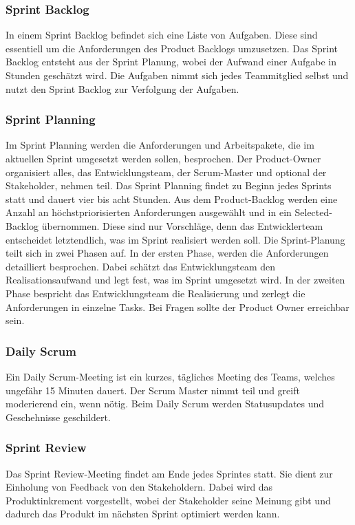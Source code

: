\subsubsection{Sprint Backlog} 
In einem Sprint Backlog befindet sich eine Liste von Aufgaben. Diese sind essentiell um die Anforderungen des Product Backlogs umzusetzen. Das Sprint Backlog entsteht aus der Sprint Planung, wobei der Aufwand einer Aufgabe in Stunden geschätzt wird. Die Aufgaben nimmt sich jedes Teammitglied selbst und nutzt den Sprint Backlog zur Verfolgung der Aufgaben. \cite{backlog}

\subsubsection{Sprint Planning} 
Im Sprint Planning werden die Anforderungen und Arbeitspakete, die im aktuellen Sprint umgesetzt werden sollen, besprochen. Der Product-Owner organisiert alles, das Entwicklungsteam, der Scrum-Master und optional der Stakeholder, nehmen teil.  Das Sprint Planning findet zu Beginn jedes Sprints statt und dauert vier bis acht Stunden. Aus dem Product-Backlog werden eine Anzahl an höchstpriorisierten Anforderungen ausgewählt und in ein Selected-Backlog übernommen. Diese sind nur Vorschläge, denn das Entwicklerteam entscheidet letztendlich, was im Sprint realisiert werden soll. Die Sprint-Planung teilt sich in zwei Phasen auf. In der ersten Phase, werden die Anforderungen detailliert besprochen. Dabei schätzt das Entwicklungsteam den Realisationsaufwand und legt fest, was im Sprint umgesetzt wird. In der zweiten Phase bespricht das Entwicklungsteam die Realisierung und zerlegt die Anforderungen in einzelne Tasks. Bei Fragen sollte der Product Owner erreichbar sein. \cite{sprintplanning}

\subsubsection{Daily Scrum} 
Ein Daily Scrum-Meeting ist ein kurzes, tägliches Meeting des Teams, welches ungefähr 15 Minuten dauert. Der Scrum Master nimmt teil und greift moderierend ein, wenn nötig. Beim Daily Scrum werden Statusupdates und Geschehnisse geschildert. \cite{dailyscrum}

\subsubsection{Sprint Review} 
Das Sprint Review-Meeting findet am Ende jedes Sprintes statt. Sie dient zur Einholung von Feedback von den Stakeholdern. Dabei wird das Produktinkrement vorgestellt, wobei der Stakeholder seine Meinung gibt und dadurch das Produkt im nächsten Sprint optimiert werden kann. \cite{sprintreview}

